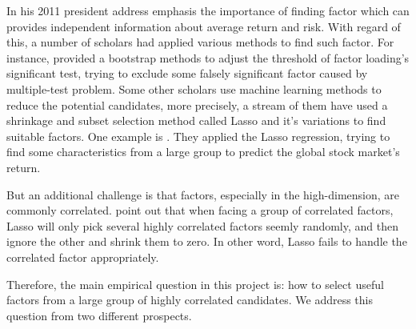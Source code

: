 In his 2011 president address \citeauthor{Cochrane2011} emphasis the importance of finding factor which can provides independent information about average return and risk.
With regard of this, a number of scholars had applied various methods to find such factor. 
For instance,  provided a bootstrap methods to adjust the threshold of factor loading's significant test, trying to exclude some falsely significant factor caused by multiple-test problem.
Some other scholars use machine learning methods to reduce the potential candidates, more precisely, a stream of them have used a shrinkage and subset selection method called Lasso \cite{Tibshirani1996} and it's variations to find suitable factors.
One example is .
They applied the Lasso regression, trying to find some characteristics from a large group to predict the global stock market's return.

But an additional challenge is that factors, especially in the high-dimension, are commonly correlated.
 point out that when facing a group of correlated factors, Lasso will only pick several highly correlated factors seemly randomly, and then ignore the other and shrink them to zero. 
In other word, Lasso fails to handle the correlated factor appropriately.





Therefore, the main empirical question in this project is: how to select useful factors from a large group of  highly correlated candidates.
We address this question from two different prospects.

